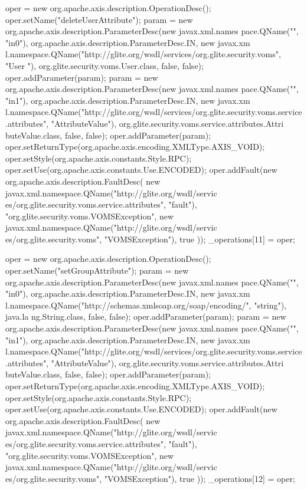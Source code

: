 \begin{DoxyCode}
{        oper = new org.apache.axis.description.OperationDesc();
        oper.setName("deleteUserAttribute");
        param = new org.apache.axis.description.ParameterDesc(new javax.xml.names
      pace.QName("", "in0"), org.apache.axis.description.ParameterDesc.IN, new javax.xm
      l.namespace.QName("http://glite.org/wsdl/services/org.glite.security.voms", "User
      "), org.glite.security.voms.User.class, false, false);
        oper.addParameter(param);
        param = new org.apache.axis.description.ParameterDesc(new javax.xml.names
      pace.QName("", "in1"), org.apache.axis.description.ParameterDesc.IN, new javax.xm
      l.namespace.QName("http://glite.org/wsdl/services/org.glite.security.voms.service
      .attributes", "AttributeValue"), org.glite.security.voms.service.attributes.Attri
      buteValue.class, false, false);
        oper.addParameter(param);
        oper.setReturnType(org.apache.axis.encoding.XMLType.AXIS_VOID);
        oper.setStyle(org.apache.axis.constants.Style.RPC);
        oper.setUse(org.apache.axis.constants.Use.ENCODED);
        oper.addFault(new org.apache.axis.description.FaultDesc(
                      new javax.xml.namespace.QName("http://glite.org/wsdl/servic
      es/org.glite.security.voms.service.attributes", "fault"),
                      "org.glite.security.voms.VOMSException",
                      new javax.xml.namespace.QName("http://glite.org/wsdl/servic
      es/org.glite.security.voms", "VOMSException"), 
                      true
                     ));
        _operations[11] = oper;

        oper = new org.apache.axis.description.OperationDesc();
        oper.setName("setGroupAttribute");
        param = new org.apache.axis.description.ParameterDesc(new javax.xml.names
      pace.QName("", "in0"), org.apache.axis.description.ParameterDesc.IN, new javax.xm
      l.namespace.QName("http://schemas.xmlsoap.org/soap/encoding/", "string"), java.la
      ng.String.class, false, false);
        oper.addParameter(param);
        param = new org.apache.axis.description.ParameterDesc(new javax.xml.names
      pace.QName("", "in1"), org.apache.axis.description.ParameterDesc.IN, new javax.xm
      l.namespace.QName("http://glite.org/wsdl/services/org.glite.security.voms.service
      .attributes", "AttributeValue"), org.glite.security.voms.service.attributes.Attri
      buteValue.class, false, false);
        oper.addParameter(param);
        oper.setReturnType(org.apache.axis.encoding.XMLType.AXIS_VOID);
        oper.setStyle(org.apache.axis.constants.Style.RPC);
        oper.setUse(org.apache.axis.constants.Use.ENCODED);
        oper.addFault(new org.apache.axis.description.FaultDesc(
                      new javax.xml.namespace.QName("http://glite.org/wsdl/servic
      es/org.glite.security.voms.service.attributes", "fault"),
                      "org.glite.security.voms.VOMSException",
                      new javax.xml.namespace.QName("http://glite.org/wsdl/servic
      es/org.glite.security.voms", "VOMSException"), 
                      true
                     ));
        _operations[12] = oper;

}
\end{DoxyCode}
